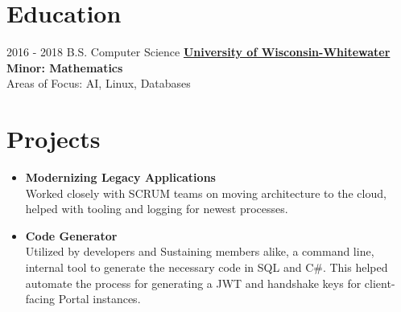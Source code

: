 \documentclass[a4paper]{mctemplate} %
\begin{document}
\begin{main}
\section{Education}

\begin{experiencelist} 
	\experienceitem
    	{2016 - 2018}
        {B.S. Computer Science}
        {\href{https://www.uww.edu/}{\textbf{University of Wisconsin-Whitewater}}}
        {\textbf{Minor: Mathematics} \\
        Areas of Focus: AI, Linux, Databases}
        {}
\end{experiencelist}


\section{Projects}
\vspace{-.2cm}

\begin{itemize}
    \item \textbf{Modernizing Legacy Applications}
    \hfill \\
    \newline
    {Worked closely with SCRUM teams on moving architecture to the cloud, helped with tooling and logging for newest processes.
    }

    \item \textbf{Code Generator}
    \hfill \\
    \newline
    Utilized by developers and Sustaining members alike, a command line, internal tool to generate the necessary code in SQL and C\#. This helped automate the process for generating a JWT and handshake keys for client-facing Portal instances.
     

\end{itemize}
\end{main}
\end{document}

